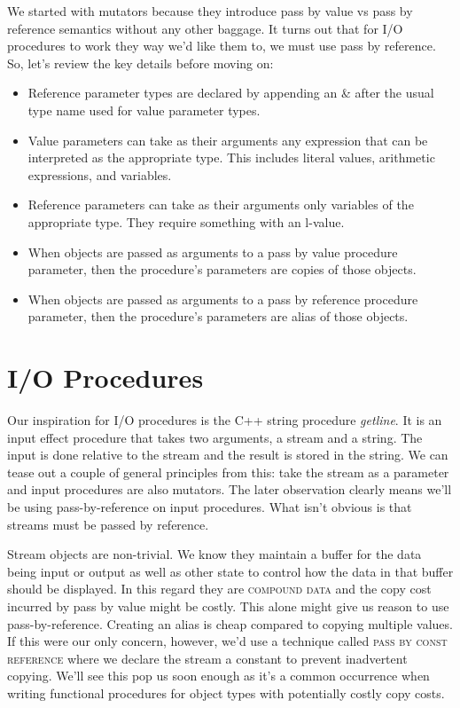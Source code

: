 \documentclass[]{tufte-handout}
\begin{document}
We started with mutators because they introduce pass by value vs pass by reference semantics without any other baggage. It turns out that for I/O procedures to work they way we'd like them to, we must use pass by reference. So, let's review the key details before moving on:
\begin{itemize}
\item Reference parameter types are declared by appending an \& after the usual type name used for value parameter types.

\item Value parameters can take as their arguments any expression that can be interpreted as the appropriate type. This includes literal values, arithmetic expressions, and variables. 

\item Reference parameters can take as their arguments only variables of the appropriate type. They require something with an l-value. 

\item When objects are passed as arguments to a pass by value procedure parameter, then the procedure's parameters are copies of those objects. 

\item When objects are passed as arguments to a pass by reference procedure parameter, then the procedure's parameters are alias of those objects.

\end{itemize} 

\section{ I/O Procedures }

Our inspiration for I/O procedures is the C++ string procedure \textit{getline}. It is an input effect procedure that takes two arguments, a stream and a string. The input is done relative to the stream and the result is stored in the string. We can tease out a couple of general principles from this: take the stream as a parameter and input procedures are also mutators. The later observation clearly means we'll be using pass-by-reference on input procedures. What isn't obvious is that streams must be passed by reference. 

Stream objects are non-trivial. We know they maintain a buffer for the data being input or output as well as other state to control how the data in that buffer should be displayed. In this regard they are \textsc{compound data} and the copy cost incurred by pass by value might be costly. This alone might give us reason to use pass-by-reference. Creating an alias is cheap compared to copying multiple values.  If this were our only concern, however, we'd use a technique called \textsc{pass by const reference} where we declare the stream a constant to prevent inadvertent copying. We'll see this pop us soon enough as it's a common occurrence when writing functional procedures for object types with potentially costly copy costs. 
\end{document}
